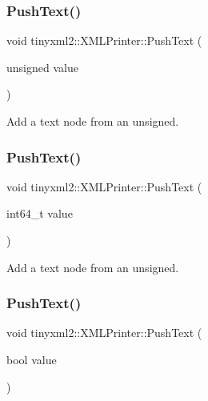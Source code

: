 \subsubsection{\texorpdfstring{Push\+Text()}{PushText()}\hspace{0.1cm}{\footnotesize\ttfamily [3/7]}}
{\footnotesize\ttfamily void tinyxml2\+::\+X\+M\+L\+Printer\+::\+Push\+Text (\begin{DoxyParamCaption}\item[{unsigned}]{value }\end{DoxyParamCaption})}



Add a text node from an unsigned. 

\mbox{\label{classtinyxml2_1_1_x_m_l_printer_a96b0a0bfe105154a0a6c37d725258f0a}} 
\subsubsection{\texorpdfstring{Push\+Text()}{PushText()}\hspace{0.1cm}{\footnotesize\ttfamily [4/7]}}
{\footnotesize\ttfamily void tinyxml2\+::\+X\+M\+L\+Printer\+::\+Push\+Text (\begin{DoxyParamCaption}\item[{int64\+\_\+t}]{value }\end{DoxyParamCaption})}



Add a text node from an unsigned. 

\mbox{\label{classtinyxml2_1_1_x_m_l_printer_a4390e5fa1ed05189a8686647345ab29f}} 
\subsubsection{\texorpdfstring{Push\+Text()}{PushText()}\hspace{0.1cm}{\footnotesize\ttfamily [5/7]}}
{\footnotesize\ttfamily void tinyxml2\+::\+X\+M\+L\+Printer\+::\+Push\+Text (\begin{DoxyParamCaption}\item[{bool}]{value }\end{DoxyParamCaption})}



